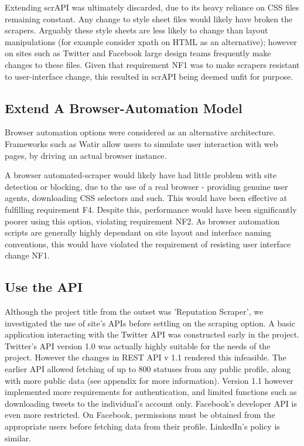 Extending scrAPI was ultimately discarded, due to its heavy reliance on CSS files remaining constant. Any change to style sheet files would likely have broken the scrapers. Arguably these style sheets are less likely to change than layout manipulations (for example consider xpath on HTML as an alternative); however on sites such as Twitter and Facebook large design teams frequently make changes to these files. Given that requirement NF1 was to make scrapers resistant to user-interface change, this resulted in scrAPI being deemed unfit for purpose. 

\subsection{Extend A Browser-Automation Model}

Browser automation options were considered as an alternative architecture. Frameworks such as Watir allow users to simulate user interaction with web pages, by driving an actual browser instance.

A browser automated-scraper would likely have had little problem with site detection or blocking, due to the use of a real browser - providing genuine user agents, downloading CSS selectors and such. This would have been effective at fulfilling requirement F4. Despite this, performance would have been significantly poorer using this option, violating requirement NF2. As browser automation scripts are generally highly dependant on site layout and interface naming conventions, this would have violated the requirement of resisting user interface change NF1. 

\subsection{Use the API}

Although the project title from the outset was 'Reputation Scraper', we investigated the use of site's APIs before settling on the scraping option. A basic application interacting with the Twitter API was constructed early in the project. Twitter's API version 1.0 was actually highly suitable for the needs of the project. However the changes in REST API v 1.1 rendered this infeasible. The earlier API allowed fetching of up to 800 statuses from any public profile, along with more public data (see appendix for more information). Version 1.1 however implemented more requirements for authentication, and limited functions such as downloading tweets to the individual's account only. Facebook's developer API is even more restricted. On Facebook, permissions must be obtained from the appropriate users before fetching data from their profile. LinkedIn's policy is similar. %

